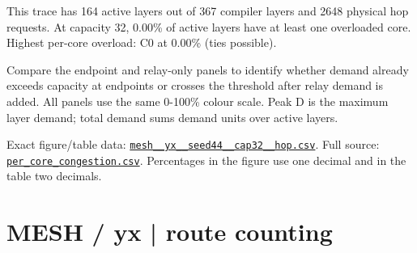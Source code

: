 \documentclass[10pt,a4paper]{article}
\begin{document}
This trace has 164 active layers out of 367 compiler layers and 2648 physical hop requests. At capacity 32, 0.00\% of active layers have at least one overloaded core. Highest per-core overload: C0 at 0.00\% (ties possible).\par
Compare the endpoint and relay-only panels to identify whether demand already exceeds capacity at endpoints or crosses the threshold after relay demand is added. All panels use the same 0-100\% colour scale. Peak D is the maximum layer demand; total demand sums demand units over active layers.\par
Exact figure/table data: \href{\detokenize{file:///home/dhruv-pansuriya/Documents/BTP/Compiler-Driven-ACE/output/pdf/qaoa_methods_congestion/tables/mesh__yx__seed44__cap32__hop.csv}}{\nolinkurl{mesh__yx__seed44__cap32__hop.csv}}. Full source: \href{\detokenize{file:///home/dhruv-pansuriya/Documents/BTP/Compiler-Driven-ACE/results/qaoa_2seed_2026-10-26/congestion/per_core_congestion.csv}}{\nolinkurl{per_core_congestion.csv}}. Percentages in the figure use one decimal and in the table two decimals.\par
\clearpage
\section*{MESH / yx | route counting}
\end{document}
